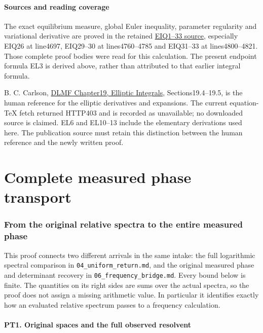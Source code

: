 \documentclass[10pt]{article}
\begin{document}
\subsection{Sources and reading coverage}\label{sources-and-reading-coverage}

The exact equilibrium measure, global Euler inequality, parameter regularity and variational derivative are proved in the retained \href{https://github.com/KokunoYumeto/zeta-function-research-reader/blob/9104d852c6bc5b79e6fc4588c403128a40b7fda3/workbenches/splitzero-tandem/continuations/20260922-arithmetic-probe-mass/RETAINED_COMPLETE_PROOF_SOURCES.tex\#L4384}{EIQ1--33 source}, especially EIQ26 at line4697, EIQ29--30 at lines4760--4785 and EIQ31--33 at lines4800--4821. Those complete proof bodies were read for this calculation. The present endpoint formula EL3 is derived above, rather than attributed to that earlier integral formula.

B. C. Carlson, \href{https://dlmf.nist.gov/19}{DLMF Chapter19, Elliptic Integrals}, Sections19.4--19.5, is the human reference for the elliptic derivatives and expansions. The current equation-TeX fetch returned HTTP403 and is recorded as unavailable; no downloaded source is claimed. EL6 and EL10--13 include the elementary derivations used here. The publication source must retain this distinction between the human reference and the newly written proof.

\clearpage\part{Complete measured phase transport}
\section{From the original relative spectra to the entire measured phase}\label{from-the-original-relative-spectra-to-the-entire-measured-phase}

This proof connects two different arrivals in the same intake: the full logarithmic spectral comparison in \texttt{04\_uniform\_return.md}, and the original measured phase and determinant recovery in \texttt{06\_frequency\_bridge.md}. Every bound below is finite. The quantities on its right sides are sums over the actual spectra, so the proof does not assign a missing arithmetic value. In particular it identifies exactly how an evaluated relative spectrum passes to a frequency calculation.

\subsection{PT1. Original spaces and the full observed resolvent}\label{pt1.-original-spaces-and-the-full-observed-resolvent}
\end{document}
